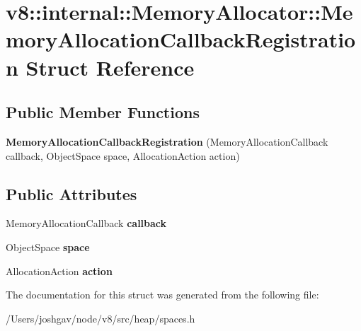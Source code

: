 \hypertarget{structv8_1_1internal_1_1_memory_allocator_1_1_memory_allocation_callback_registration}{}\section{v8\+:\+:internal\+:\+:Memory\+Allocator\+:\+:Memory\+Allocation\+Callback\+Registration Struct Reference}
\label{structv8_1_1internal_1_1_memory_allocator_1_1_memory_allocation_callback_registration}
\subsection*{Public Member Functions}
\begin{DoxyCompactItemize}
\item 
{\bfseries Memory\+Allocation\+Callback\+Registration} (Memory\+Allocation\+Callback callback, Object\+Space space, Allocation\+Action action)\hypertarget{structv8_1_1internal_1_1_memory_allocator_1_1_memory_allocation_callback_registration_a79912f6b05e47dc481d4fc3e28e9e87f}{}\label{structv8_1_1internal_1_1_memory_allocator_1_1_memory_allocation_callback_registration_a79912f6b05e47dc481d4fc3e28e9e87f}

\end{DoxyCompactItemize}
\subsection*{Public Attributes}
\begin{DoxyCompactItemize}
\item 
Memory\+Allocation\+Callback {\bfseries callback}\hypertarget{structv8_1_1internal_1_1_memory_allocator_1_1_memory_allocation_callback_registration_a5ddbb27904801dad1f5b1584b48f0569}{}\label{structv8_1_1internal_1_1_memory_allocator_1_1_memory_allocation_callback_registration_a5ddbb27904801dad1f5b1584b48f0569}

\item 
Object\+Space {\bfseries space}\hypertarget{structv8_1_1internal_1_1_memory_allocator_1_1_memory_allocation_callback_registration_a2c727d11cea47f881b41e1f6ea33a0ba}{}\label{structv8_1_1internal_1_1_memory_allocator_1_1_memory_allocation_callback_registration_a2c727d11cea47f881b41e1f6ea33a0ba}

\item 
Allocation\+Action {\bfseries action}\hypertarget{structv8_1_1internal_1_1_memory_allocator_1_1_memory_allocation_callback_registration_a43b8bf299d465037c205e7a2532b979c}{}\label{structv8_1_1internal_1_1_memory_allocator_1_1_memory_allocation_callback_registration_a43b8bf299d465037c205e7a2532b979c}

\end{DoxyCompactItemize}


The documentation for this struct was generated from the following file\+:\begin{DoxyCompactItemize}
\item 
/\+Users/joshgav/node/v8/src/heap/spaces.\+h\end{DoxyCompactItemize}
